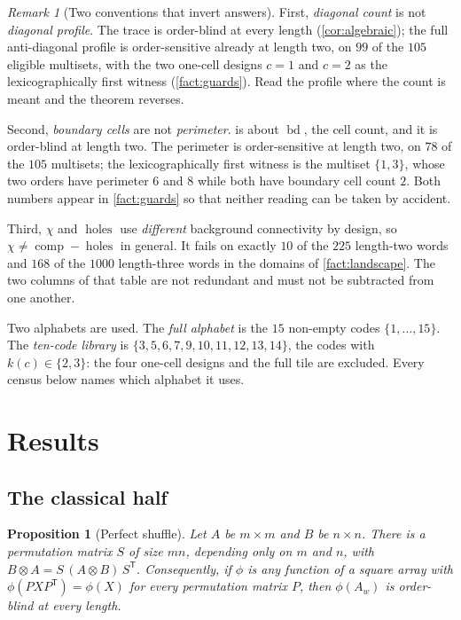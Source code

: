 \documentclass[11pt]{amsart}
\newtheorem{proposition}[theorem]{Proposition}
\theoremstyle{definition}
\theoremstyle{remark}
\newtheorem{remark}[theorem]{Remark}
\begin{document}
\begin{remark}[Two conventions that invert answers]
\label{rem:guards}
First, \emph{diagonal count} is not \emph{diagonal profile}. The trace is order-blind at every length (\cref{cor:algebraic}); the full anti-diagonal profile is order-sensitive already at length two, on $99$ of the $105$ eligible multisets, with the two one-cell designs $c=1$ and $c=2$ as the lexicographically first witness (\cref{fact:guards}). Read the profile where the count is meant and the theorem reverses.

Second, \emph{boundary cells} are not \emph{perimeter}.  is about $\operatorname{bd}$, the cell count, and it is order-blind at length two. The perimeter is order-sensitive at length two, on $78$ of the $105$ multisets; the lexicographically first witness is the multiset $\{1,3\}$, whose two orders have perimeter $6$ and $8$ while both have boundary cell count $2$. Both numbers appear in \cref{fact:guards} so that neither reading can be taken by accident.

Third, $\chi$ and $\operatorname{holes}$ use \emph{different} background connectivity by design, so $\chi \neq \operatorname{comp} - \operatorname{holes}$ in general. It fails on exactly $10$ of the $225$ length-two words and $168$ of the $1000$ length-three words in the domains of \cref{fact:landscape}. The two columns of that table are not redundant and must not be subtracted from one another.
\end{remark}

Two alphabets are used. The \emph{full alphabet} is the $15$ non-empty codes $\{1,\dots,15\}$. The \emph{ten-code library} is $\{3,5,6,7,9,10,11,12,13,14\}$, the codes with $k(c) \in \{2,3\}$: the four one-cell designs and the full tile are excluded. Every census below names which alphabet it uses.

\section{Results}
\label{sec:res}

\subsection{The classical half}

\begin{proposition}[Perfect shuffle]
\label{prop:shuffle}
Let $A$ be $m \times m$ and $B$ be $n \times n$. There is a permutation matrix $S$ of size $mn$, depending only on $m$ and $n$, with $B \otimes A = S\,(A \otimes B)\,S^{\mathsf T}$. Consequently, if $\phi$ is any function of a square array with $\phi(P X P^{\mathsf T}) = \phi(X)$ for every permutation matrix $P$, then $\phi(A_w)$ is order-blind at every length.
\end{proposition}
\end{document}
